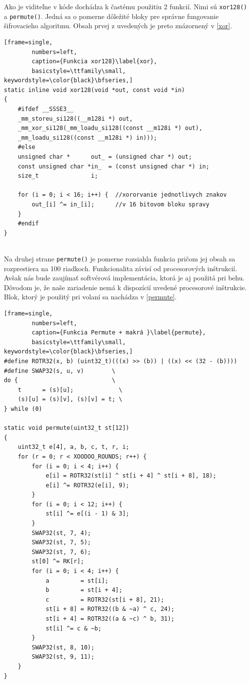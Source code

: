 Ako je viditeľne v kóde dochádza k častému použitiu 2 funkcií. Nimi sú  \lstinline|xor128()| a  \lstinline|permute()|. Jedná sa o pomerne dôležité bloky pre správne fungovanie šifrovacieho algoritmu. Obsah prvej z uvedených je preto znázornený v \ref{xor}.

\begin{minipage}{\linewidth} 	
	\begin{lstlisting}[frame=single,
		numbers=left,
		caption={Funkcia xor128}\label{xor},
		basicstyle=\ttfamily\small, keywordstyle=\color{black}\bfseries,]
static inline void xor128(void *out, const void *in)
{
	#ifdef __SSSE3__
	_mm_storeu_si128((__m128i *) out,
	_mm_xor_si128(_mm_loadu_si128((const __m128i *) out),
	_mm_loadu_si128((const __m128i *) in)));
	#else
	unsigned char *      out_ = (unsigned char *) out;
	const unsigned char *in_  = (const unsigned char *) in;
	size_t               i;
	
	for (i = 0; i < 16; i++) {	//xororvanie jednotlivych znakov 
		out_[i] ^= in_[i];		//v 16 bitovom bloku spravy
	}
	#endif
}
  	\end{lstlisting}
\end{minipage}\\ 

Na druhej strane \lstinline|permute()| je pomerne rozsiahla funkcia pričom jej obsah sa rozprestiera na 100 riadkoch. Funkcionalita závisí od procesorových inštrukcií. Avšak nás bude zaujímať softvérová implementácia, ktorá je aj použitá pri behu. Dôvodom je, že naše zariadenie nemá k dispozícií uvedené procesorové inštrukcie. Blok, ktorý je použitý pri volaní sa nachádza v \ref{permute}.   

\begin{minipage}{\linewidth} 	
	\begin{lstlisting}[frame=single,
		numbers=left,
		caption={Funkcia Permute + makrá }\label{permute},
		basicstyle=\ttfamily\small, keywordstyle=\color{black}\bfseries,]
#define ROTR32(x, b) (uint32_t)(((x) >> (b)) | ((x) << (32 - (b))))
#define SWAP32(s, u, v)        \
do {                           \
	t      = (s)[u];             \
	(s)[u] = (s)[v], (s)[v] = t; \
} while (0)
	
static void permute(uint32_t st[12])
{
	uint32_t e[4], a, b, c, t, r, i;	
	for (r = 0; r < XOODOO_ROUNDS; r++) {
		for (i = 0; i < 4; i++) {
			e[i] = ROTR32(st[i] ^ st[i + 4] ^ st[i + 8], 18);
			e[i] ^= ROTR32(e[i], 9);
		}
		for (i = 0; i < 12; i++) {
			st[i] ^= e[(i - 1) & 3];
		}
		SWAP32(st, 7, 4);
		SWAP32(st, 7, 5);
		SWAP32(st, 7, 6);
		st[0] ^= RK[r];
		for (i = 0; i < 4; i++) {
			a         = st[i];
			b         = st[i + 4];
			c         = ROTR32(st[i + 8], 21);
			st[i + 8] = ROTR32((b & ~a) ^ c, 24);
			st[i + 4] = ROTR32((a & ~c) ^ b, 31);
			st[i] ^= c & ~b;
		}
		SWAP32(st, 8, 10);
		SWAP32(st, 9, 11);
	}	
}
	\end{lstlisting}
\end{minipage}\\ 

